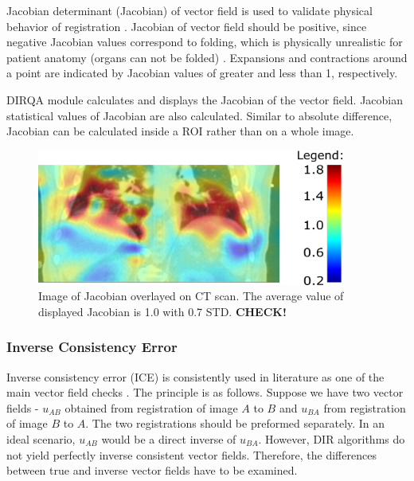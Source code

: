 \documentclass[type=dr, dr=rernat, accentcolor=tud7b,colorbacktitle, bigchapter, openright, twoside, 12pt ]{tudthesis}
\begin{document}
Jacobian determinant (Jacobian) of vector field is used to validate physical behavior of registration \cite{Leow2007}. Jacobian of vector field should be positive, since negative Jacobian values correspond to folding, which is physically unrealistic for patient anatomy (organs can not be folded) \cite{ Rey2002, Chen2008}. Expansions and contractions around a point are indicated by Jacobian values of greater and less than 1, respectively. 

DIRQA module calculates and displays the Jacobian of the vector field. Jacobian statistical values of Jacobian are also calculated. Similar to absolute difference, Jacobian can be calculated inside a ROI rather than on a whole image.

\begin{figure}[H]
	\begin{center}		
		\includegraphics[width=0.9\textwidth]{./Images/jacobian.png}
		\caption{Image of Jacobian overlayed on CT scan. The average value of displayed Jacobian is 1.0 with 0.7 STD. \textbf{CHECK!}}
		\label{Jacobian}
	\end{center}
\end{figure}

\subsubsection{Inverse Consistency Error}
\label{ICE}

Inverse consistency error (ICE) is consistently used in literature as one of the main vector field checks \cite{Christensen2001, Bender2009}. The principle is as follows. Suppose we have two vector fields - $u_{AB}$ obtained from registration of image $A$ to $B$ and $u_{BA}$ from registration of image $B$ to $A$. The two registrations
should be preformed separately. In an ideal scenario, $u_{AB}$ would be a direct inverse of $u_{BA}$. However, DIR algorithms do not yield perfectly inverse consistent vector fields. Therefore, the differences between true and inverse vector fields have to be examined.
\end{document}

